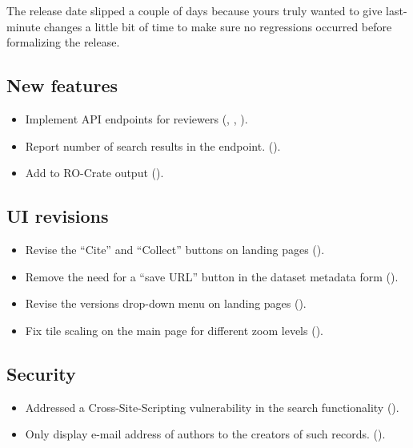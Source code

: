   The release date slipped a couple of days because yours truly wanted to
  give last-minute changes a little bit of time to make sure no regressions
  occurred before formalizing the release.

\subsection*{New features}
\begin{itemize}
\item{Implement API endpoints for reviewers
    (,
    ,
    ).}
\item{Report number of search results in the  endpoint.
    ().}
\item{Add  to RO-Crate output
    ().}
\end{itemize}

\subsection*{UI revisions}
\begin{itemize}
\item{Revise the ``Cite'' and ``Collect'' buttons on landing pages
    ().}
\item{Remove the need for a ``save URL'' button in the dataset metadata form
    ().}
\item{Revise the versions drop-down menu on landing pages
    ().}
\item{Fix tile scaling on the main page for different zoom levels
    ().}
\end{itemize}
\subsection*{Security}

\begin{itemize}
\item{Addressed a Cross-Site-Scripting vulnerability in the search functionality
    ().}
\item{Only display e-mail address of authors to the creators of such records.
    ().}
\end{itemize}

